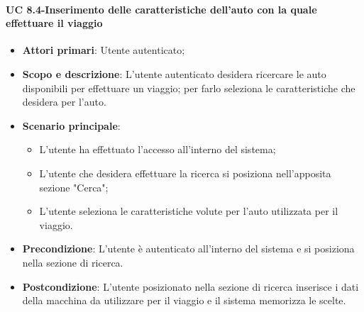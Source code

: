         \paragraph{UC 8.4-Inserimento delle caratteristiche dell'auto con la quale effettuare il viaggio}
       \begin{itemize}
        \item \textbf{Attori primari}: Utente autenticato;
      
        \item \textbf{Scopo e descrizione}: L'utente autenticato desidera ricercare le auto disponibili per effettuare un viaggio; per farlo seleziona le caratteristiche che desidera per l'auto.
        \item \textbf{Scenario principale}:
            \begin{itemize}
                \item L'utente ha effettuato l'accesso all'interno del sistema;
                \item L'utente che desidera effettuare la ricerca si posiziona nell'apposita sezione "Cerca";
                \item L'utente seleziona le caratteristiche volute per l'auto utilizzata per il viaggio.
            \end{itemize}
        
        \item \textbf{Precondizione}: L'utente è autenticato all'interno del sistema e si posiziona nella sezione di ricerca.
        \item \textbf{Postcondizione}: L'utente posizionato nella sezione di ricerca inserisce i dati della macchina da utilizzare per il viaggio e il sistema memorizza le scelte.
        \end{itemize}
        
        
